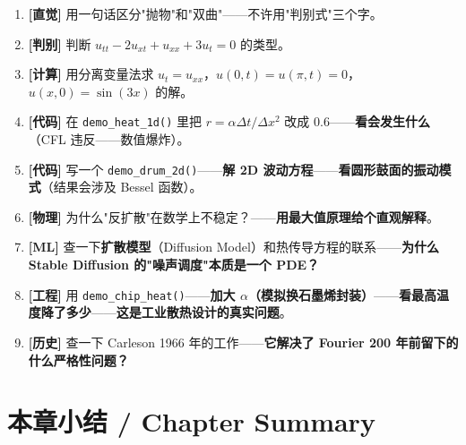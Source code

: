 \begin{enumerate}
\item \textbf{[直觉]} 用一句话区分"抛物"和"双曲"——不许用"判别式"三个字。
\item \textbf{[判别]} 判断 $u_{tt} - 2 u_{xt} + u_{xx} + 3 u_t = 0$ 的类型。
\item \textbf{[计算]} 用分离变量法求 $u_t = u_{xx}$，$u(0,t)=u(\pi,t)=0$，$u(x,0)=\sin(3x)$ 的解。
\item \textbf{[代码]} 在 \texttt{demo\_heat\_1d()} 里把 $r = \alpha \Delta t / \Delta x^2$ 改成 $0.6$——\textbf{看会发生什么}（CFL 违反——数值爆炸）。
\item \textbf{[代码]} 写一个 \texttt{demo\_drum\_2d()}——\textbf{解 2D 波动方程}——\textbf{看圆形鼓面的振动模式}（结果会涉及 Bessel 函数）。
\item \textbf{[物理]} 为什么"反扩散"在数学上不稳定？——\textbf{用最大值原理给个直观解释}。
\item \textbf{[ML]} 查一下\textbf{扩散模型}（Diffusion Model）和热传导方程的联系——\textbf{为什么 Stable Diffusion 的"噪声调度"本质是一个 PDE？}
\item \textbf{[工程]} 用 \texttt{demo\_chip\_heat()}——\textbf{加大 $\alpha$（模拟换石墨烯封装）}——\textbf{看最高温度降了多少}——\textbf{这是工业散热设计的真实问题}。
\item \textbf{[历史]} 查一下 Carleson 1966 年的工作——\textbf{它解决了 Fourier 200 年前留下的什么严格性问题？}
\end{enumerate}

\section{本章小结 / Chapter Summary}

